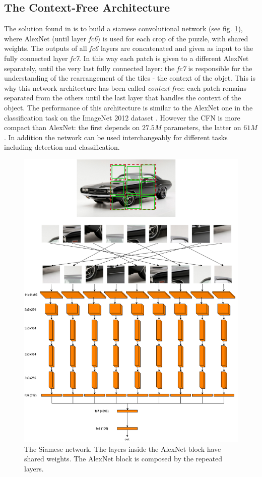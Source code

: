 \subsection{The Context-Free Architecture}\label{ss:CFN}
The solution found in \cite{Noroozi_2016} is to build a siamese convolutional network (see fig. \ref{fig:siamese_network}), where AlexNet (until layer \textit{fc6}) is used for each crop of the puzzle, with shared weights. The outputs of all \textit{fc6} layers are concatenated and given as input to the fully connected layer \textit{fc7}. In this way each patch is given to a different AlexNet separately, until the very last fully connected layer: the \textit{fc7} is responsible for the understanding of the rearrangement of the tiles - the context of the objet. This is why this network architecture has been called \textit{context-free}: each patch remains separated from the others until the last layer that handles the context of the object. \newline
The performance of this architecture is similar to the AlexNet one in the classification task on the ImageNet 2012 dataset \cite{Imagenet_large_scale_hierarchical_image_database}. However the CFN is more compact than AlexNet: the first depends on \(27.5M\) parameters, the latter on \(61M\). In addition the network can be used interchangeably for different tasks including detection and classification.
\begin{figure}[!ht]
    \centering
    \includegraphics[scale=0.26]{images/Siamese_diagram.png}
    \caption{The Siamese network. The layers inside the AlexNet block have shared weights. The AlexNet block is composed by the repeated layers.}
    \label{fig:siamese_network}
\end{figure}
